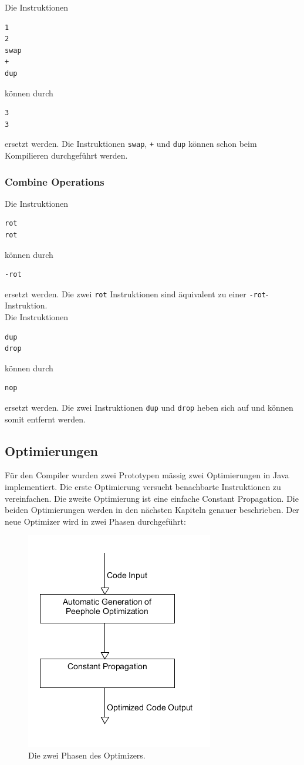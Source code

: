 Die Instruktionen
%
\begin{verbatim}
1
2
swap
+
dup
\end{verbatim}
%
können durch
%
\begin{verbatim}
3
3
\end{verbatim}
%
ersetzt werden. Die Instruktionen \verb!swap!, \verb!+! und \verb!dup! können schon beim Kompilieren durchgeführt werden.
\subsubsection{Combine Operations}
Die Instruktionen
%
\begin{verbatim}
rot
rot
\end{verbatim}
%
können durch
%
\begin{verbatim}
-rot
\end{verbatim}
%
ersetzt werden. Die zwei \verb!rot! Instruktionen sind äquivalent zu einer \verb!-rot!-Instruktion. \\Die Instruktionen
%
\begin{verbatim}
dup
drop
\end{verbatim}
%
können durch
%
\begin{verbatim}
nop
\end{verbatim}
%
ersetzt werden. Die zwei Instruktionen \verb!dup! und \verb!drop! heben sich auf und können somit entfernt werden.

\newpage

\subsection{Optimierungen}

Für den Compiler wurden zwei Prototypen mässig zwei Optimierungen in Java implementiert. Die erste Optimierung versucht benachbarte Instruktionen zu vereinfachen. Die zweite Optimierung ist eine einfache Constant Propagation. Die beiden Optimierungen werden in den nächsten Kapiteln genauer beschrieben. Der neue Optimizer wird in zwei Phasen durchgeführt:

\begin{figure}[H]
	\centering
		\includegraphics[scale=0.6]{optimizer/optimizer.png}
		\caption{Die zwei Phasen des Optimizers.}
		\label{fig:optimizer}
\end{figure}


